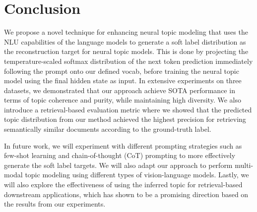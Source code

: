 \documentclass{article}
\theoremstyle{plain}
\theoremstyle{definition}
\theoremstyle{remark}
\begin{document}


\section{Conclusion}
We propose a novel technique for enhancing neural topic modeling that uses the NLU capabilities of the language models to generate %
a soft label distribution as the reconstruction target for neural topic models. 
This is done by projecting the temperature-scaled softmax distribution of the next token prediction immediately following the prompt onto our defined vocab, before training the neural topic model using the final hidden state as input.
In extensive experiments on three datasets, we demonstrated that our approach 
achieve SOTA performance in terms of topic coherence and purity, while maintaining high diversity. We also introduce a retrieval-based evaluation metric where we showed that the predicted topic distribution from our method achieved the highest precision for retrieving semantically similar documents according to the ground-truth label.

In future work, we will experiment with different prompting strategies such as few-shot learning \citep{brown2020language} and chain-of-thought (CoT) prompting \citep{wei2022chain}  to more effectively generate the soft label targets.
We will also adapt our approach to perform multi-modal topic modeling using different types of vision-language models.
Lastly, we will also explore the effectiveness of using the inferred topic for retrieval-based downstream applications, which has shown to be a promising direction based on the results from our experiments.
\end{document}
